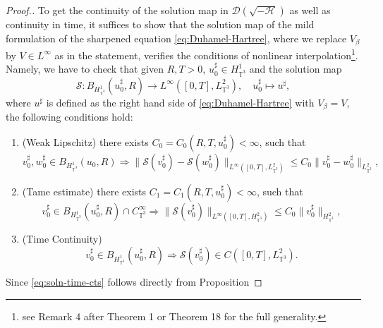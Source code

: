 {\begin{proof}[Proof.]
  To get the continuity of the solution map in $\mathcal{D} \left( \sqrt{-
  \mathcal{H}} \right)$ as well as continuity in time, it suffices to show
  that the solution map of the mild formulation of the sharpened equation
  \eqref{eq:Duhamel-Hartree}, where we replace $V_{\beta}$ by $V \in
  L^{\infty}$ as in the statement, verifies the conditions of nonlinear
  interpolation\footnote{see {\cite{ABITZ24}} Remark 4 after Theorem 1 or Theorem 18
  for the full generality.}. Namely, we have to check that given $R, T > 0$, $u^{\sharp}_0 \in
  H_{\mathbb{T}^3}^1$ and the solution map
  \begin{equation}
    \mathcal{S}: B_{H_{\mathbb{T}^3}^1} (u^{\sharp}_0, R) \rightarrow
    L^{\infty} ([0, T], L^2_{\mathbb{T}^3}), \quad u^{\sharp}_0 \mapsto
    u^{\sharp},
  \end{equation}
where $u^{\sharp}$ is defined as the right hand side of 
    \eqref{eq:Duhamel-Hartree}  with $V_{\beta} = V$,
  the following conditions hold:
  \begin{enumerate}
    \item (Weak Lipschitz) there exists $C_0 = C_0 (R, T, u^{\sharp}_0) <
    \infty$, such that
    \begin{equation}
      v^{\sharp}_0, w^{\sharp}_0 \in B_{H_{\mathbb{T}^3}^1} (u_0, R)
      \Rightarrow \| \mathcal{S} (v^{\sharp}_0) -\mathcal{S} (w^{\sharp}_0)
      \|_{L^{\infty} ([0, T], L_{\mathbb{T}^3}^2)} \leq C_0 \| v^{\sharp}_0 -
      w^{\sharp}_0 \|_{L_{\mathbb{T}^3}^2}, \label{eq:soln-weak-Lip}
    \end{equation}
    \item (Tame estimate) there exists $C_1 = C_1 (R, T, u^{\sharp}_0) <
    \infty$, such that
    \begin{equation}
      v^{\sharp}_0 \in B_{H_{\mathbb{T}^3}^1} (u^{\sharp}_0, R) \cap
      C_{\mathbb{T}^3}^{\infty} \Rightarrow \| \mathcal{S} (v^{\sharp}_0)
      \|_{L^{\infty} ([0, T], H_{\mathbb{T}^3}^2)} \leq C_0 \| v^{\sharp}_0
      \|_{H_{\mathbb{T}^3}^2}, \label{eq:soln-tame-est}
    \end{equation}
    \item (Time Continuity)
    \begin{equation}
      v^{\sharp}_0 \in B_{H_{\mathbb{T}^3}^1} (u^{\sharp}_0, R) \Rightarrow
      \mathcal{S} (v^{\sharp}_0) \in C ([0, T], L^2_{\mathbb{T}^3}) .
      \label{eq:soln-time-cts}
    \end{equation}
  \end{enumerate}
  Since \eqref{eq:soln-time-cts} follows directly from Proposition

\end{proof}}
